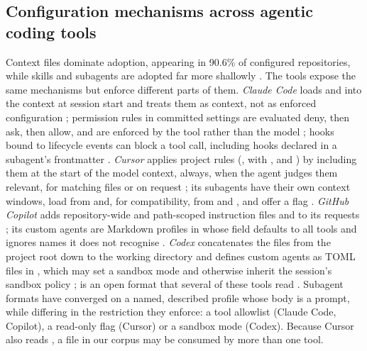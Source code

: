 \subsection{Configuration mechanisms across agentic coding tools}
\label{sec:bg-mechanisms}
Context files dominate adoption, appearing
in 90.6\% of configured repositories, while skills and subagents are adopted far more shallowly
\citep[\S6.1--6.3]{Galster2026Harness}. The tools expose the same mechanisms but enforce different parts of them.
\emph{Claude Code} loads  and  into the context at session start and treats them as
context, not as enforced configuration \citep{AnthropicMemoryDoc}; permission rules in committed settings are evaluated
deny, then ask, then allow, and are enforced by the tool rather than the model \citep{AnthropicPermissionsDoc,
AnthropicSettingsDoc}; hooks bound to lifecycle events can block a tool call, including hooks declared in a subagent's
frontmatter \citep{AnthropicHooksDoc}. \emph{Cursor} applies project rules (, with
,  and ) by including them at the start of the model context, always,
when the agent judges them relevant, for matching files or on request \citep{CursorRulesDoc}; its subagents have their
own context windows, load from  and, for compatibility, from  and
, and offer a  flag \citep{CursorSubagentsDoc}. \emph{GitHub Copilot} adds
repository-wide and path-scoped instruction files and  to its requests
\citep{GitHubCopilotInstructionsDoc}; its custom agents are Markdown profiles in  whose 
field defaults to all tools and ignores names it does not recognise \citep{GitHubCreateCustomAgentsDoc,
GitHubCustomAgentsDoc}. \emph{Codex} concatenates the  files from the project root down to the working
directory \citep{OpenAICodexAgentsMdDoc} and defines custom agents as TOML files in , which may set a
sandbox mode and otherwise inherit the session's sandbox policy \citep{OpenAICodexSubagentsDoc};  is an
open format that several of these tools read \citep{AgentsMdSpec}. Subagent formats have converged on a named,
described profile whose body is a prompt, while differing in the restriction they enforce: a tool allowlist (Claude
Code, Copilot), a read-only flag (Cursor) or a sandbox mode (Codex). Because Cursor also reads
, a file in our corpus may be consumed by more than one tool.

